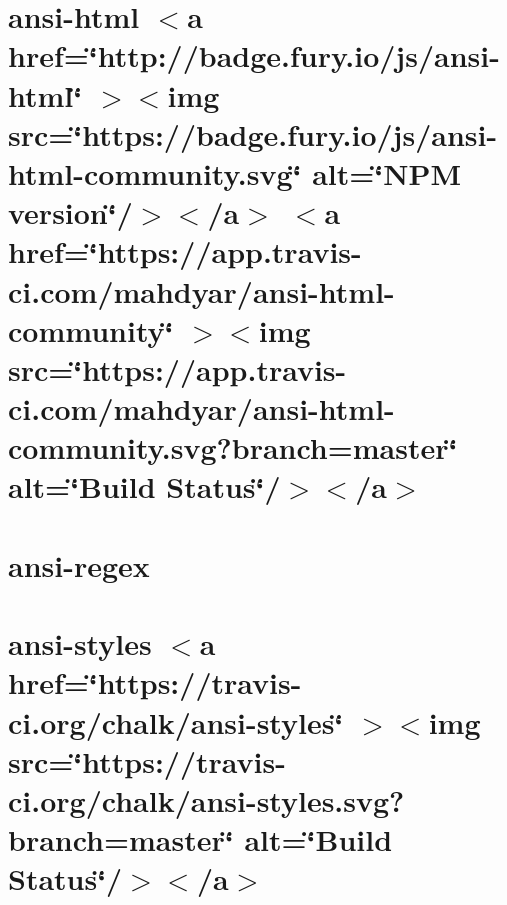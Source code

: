 \documentclass[twoside]{book}
\newcommand{\+}{\discretionary{\mbox{\scriptsize$\hookleftarrow$}}{}{}}
\begin{document}
\chapter{ansi-\/html \texorpdfstring{$<$}{<}a href=\char`\"{}http\+://badge.\+fury.\+io/js/ansi-\/html\char`\"{} \texorpdfstring{$>$}{>}\texorpdfstring{$<$}{<}img src=\char`\"{}https\+://badge.\+fury.\+io/js/ansi-\/html-\/community.\+svg\char`\"{} alt=\char`\"{}\+NPM version\char`\"{}/\texorpdfstring{$>$}{>}\texorpdfstring{$<$}{<}/a\texorpdfstring{$>$}{>} \texorpdfstring{$<$}{<}a href=\char`\"{}https\+://app.\+travis-\/ci.\+com/mahdyar/ansi-\/html-\/community\char`\"{} \texorpdfstring{$>$}{>}\texorpdfstring{$<$}{<}img src=\char`\"{}https\+://app.\+travis-\/ci.\+com/mahdyar/ansi-\/html-\/community.\+svg?branch=master\char`\"{} alt=\char`\"{}\+Build Status\char`\"{}/\texorpdfstring{$>$}{>}\texorpdfstring{$<$}{<}/a\texorpdfstring{$>$}{>}}
\label{md__c___users_vaishnavi_jadhav__desktop__developer_code_mean_stack_example_client_node_modules_ansi_html_community__r_e_a_d_m_e}

\chapter{ansi-\/regex}
\label{md__c___users_vaishnavi_jadhav__desktop__developer_code_mean_stack_example_client_node_modules_ansi_regex_readme}

\chapter{ansi-\/styles \texorpdfstring{$<$}{<}a href=\char`\"{}https\+://travis-\/ci.\+org/chalk/ansi-\/styles\char`\"{} \texorpdfstring{$>$}{>}\texorpdfstring{$<$}{<}img src=\char`\"{}https\+://travis-\/ci.\+org/chalk/ansi-\/styles.\+svg?branch=master\char`\"{} alt=\char`\"{}\+Build Status\char`\"{}/\texorpdfstring{$>$}{>}\texorpdfstring{$<$}{<}/a\texorpdfstring{$>$}{>}}
\label{md__c___users_vaishnavi_jadhav__desktop__developer_code_mean_stack_example_client_node_modules_ansi_styles_readme}

\end{document}
